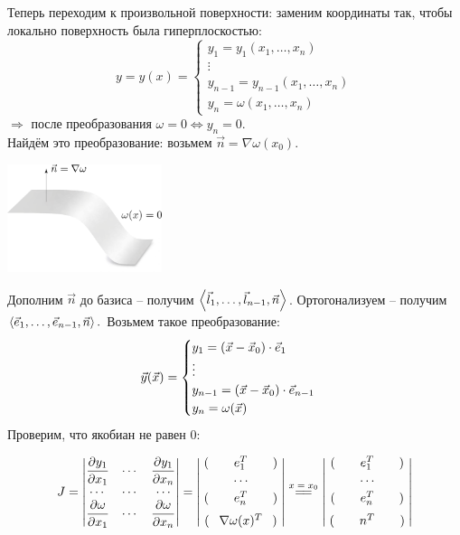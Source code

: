 \documentclass[../main.tex]{subfiles}
\begin{document}
Теперь переходим к произвольной поверхности: заменим координаты так, чтобы локально поверхность была гиперплоскостью:
\[y = y(x) = \begin{cases} y_1 = y_1(x_1,\dots, x_n) \\ \vdots \\ y_{n-1} = y_{n-1}(x_1,\dots,x_n) \\ y_n = \omega(x_1,\dots,x_n) \end{cases} \]
$\Rightarrow$ после преобразования $\omega=0 \Leftrightarrow y_n=0$.\\
Найдём это преобразование: возьмем $\vec{n} = \nabla \omega(x_0)$.
\vspace{0.2em}
\begin{center}
\includegraphics[width=0.34\textwidth]{./pic 2_1.pdf}
\end{center}
\vspace{-0.7em} %
Дополним $\vec{n}$ до базиса -- получим $\left\langle \vec{l}_1,\dots,\vec{l}_{n-1},\vec{n} \right\rangle$. Ортогонализуем -- получим $\left\langle \vec{e}_1,\dots,\vec{e}_{n-1},\vec{n} \right\rangle.$ Возьмем такое преобразование:
\[ \vec{y}(\vec{x}) = \begin{cases} y_1 = \left(\vec{x}-\vec{x}_0\right) \cdot \vec{e}_1 \\ \vdots \\ y_{n-1} = \left(\vec{x}-\vec{x}_0\right) \cdot \vec{e}_{n-1} \\ y_n = \omega(\vec{x}) \end{cases}\]
Проверим, что якобиан не равен 0:

$$
J = \begin{vmatrix} 
\pd{y_1}{x_1} & \cdots & \pd{y_1}{x_n} \\
\cdots &\cdots &\cdots \\
\pd{\omega}{x_1} & \cdots & \pd{\omega}{x_n} \end{vmatrix}
= \begin{vmatrix}
\;(\qquad e_1^T \qquad)\;\\[0.2em]
\cdots\\[0.2em]
\;(\qquad e_n^T \qquad)\;\\[0.6em]
\;(\;\;\: \nabla\omega(x)^T \;\;\:)\;
\end{vmatrix}
\overset{\text{$x = x_0$}}{=\joinrel=}
\begin{vmatrix}
    \;(\qquad e_1^T \qquad)\;\\[0.2em]
    \cdots\\[0.2em]
    \;(\qquad e_n^T \qquad)\;\\[0.6em]
    \;(\qquad n^T \qquad)\;
    \end{vmatrix}
$$
\end{document}
